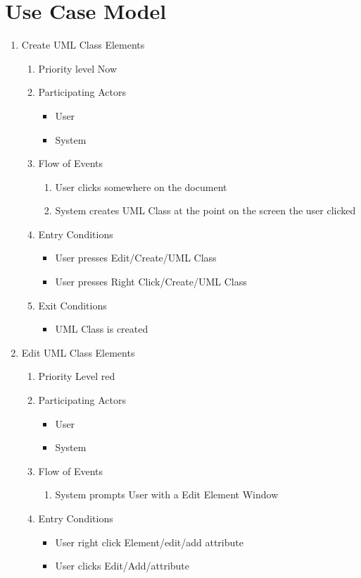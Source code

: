 \documentclass[a4paper, 12pt]{article}
\begin{document}
\section{Use Case Model}

\begin{enumerate}
\item Create UML Class Elements
  \begin {enumerate}
  \item Priority level Now
  \item Participating Actors
    \begin{itemize}
    \item User
    \item System
    \end {itemize}
  \item Flow of Events
    \begin {enumerate}
    \item User clicks somewhere on the document
    \item System creates UML Class at the point on the screen the user clicked
    \end {enumerate}
  \item Entry Conditions
    \begin {itemize}
    \item User presses Edit/Create/UML Class
    \item User presses Right Click/Create/UML Class
    \end {itemize}
  \item Exit Conditions
    \begin {itemize}
    \item UML Class is created
    \end {itemize}
  \end {enumerate}

\item Edit UML Class Elements
  \begin {enumerate}
  \item Priority Level red
  \item Participating Actors
    \begin {itemize}
    \item User
    \item System
    \end {itemize}
  \item Flow of Events
    \begin {enumerate}
    \item System prompts User with a Edit Element Window
    \end {enumerate}
  \item Entry Conditions
    \begin {itemize}
    \item User right click Element/edit/add attribute
    \item User clicks Edit/Add/attribute
    \end {itemize}
  \end {enumerate}


\end{enumerate}
\end{document}
